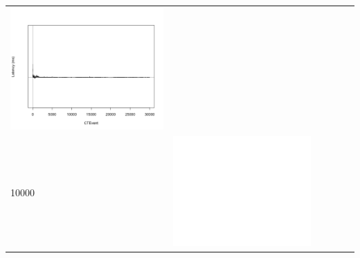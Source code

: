 \begin{table}[htbp]
{\begin{tabular}{l | ccccc}
\begin{minipage}{.15\textwidth}
				\vspace{2pt}
     			 	\includegraphics[width=\linewidth]{images/lat-log-graph/I13}
    				 \end{minipage}\\
		10000  &	 \begin{minipage}{.15\textwidth}
     			 	
				\vspace{2pt}
     			 	\includegraphics[width=\linewidth]{images/lat-log-graph/I5}
    				 \end{minipage}
    			   &	 \begin{minipage}{.15\textwidth}
     			 	

\end{minipage}
\end{tabular}}
\end{table}
